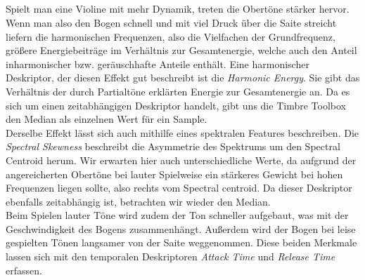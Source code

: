 \subsection{}
Spielt man eine Violine mit mehr Dynamik, treten die Obertöne stärker hervor.
Wenn man also den Bogen schnell und mit viel Druck über die Saite streicht liefern die harmonischen Frequenzen, also die Vielfachen der Grundfrequenz, größere Energiebeiträge im Verhältnis zur Gesamtenergie, welche auch den Anteil inharmonischer bzw. geräuschhafte Anteile enthält.  
Eine harmonischer Deskriptor, der diesen Effekt gut beschreibt ist die \textit{Harmonic Energy}. Sie gibt das Verhältnis der durch Partialtöne erklärten Energie zur Gesamtenergie an. Da es sich um einen zeitabhängigen Deskriptor handelt, gibt uns die Timbre Toolbox den Median als einzelnen Wert für ein Sample.\\ 
Derselbe Effekt lässt sich auch mithilfe eines spektralen Features beschreiben. Die \textit{Spectral Skewness} beschreibt die Asymmetrie des Spektrums um den Spectral Centroid herum. Wir erwarten hier auch unterschiedliche Werte, da aufgrund der angereicherten Obertöne bei lauter Spielweise ein stärkeres Gewicht bei hohen Frequenzen liegen sollte, also rechts vom Spectral centroid. Da dieser Deskriptor ebenfalls zeitabhängig ist, betrachten wir wieder den Median.\\
Beim Spielen lauter Töne wird zudem der Ton schneller aufgebaut, was mit der Geschwindigkeit des Bogens zusammenhängt. Außerdem wird der Bogen bei leise gespielten Tönen langsamer von der Saite weggenommen. Diese beiden Merkmale lassen sich mit den temporalen Deskriptoren \textit{Attack Time} und \textit{Release Time} erfassen. \\

